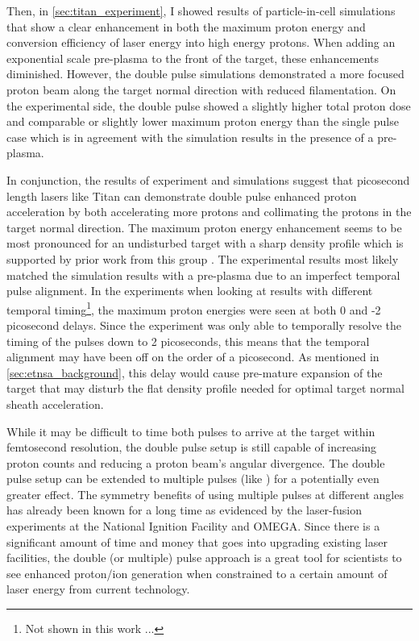 Then, in \autoref{sec:titan_experiment}, I showed results of particle-in-cell simulations that show a clear enhancement in both the maximum proton energy and conversion efficiency of laser energy into high energy protons. When adding an exponential scale pre-plasma to the front of the target, these enhancements diminished. However, the double pulse simulations demonstrated a more focused proton beam along the target normal direction with reduced filamentation. On the experimental side, the double pulse showed a slightly higher total proton dose and comparable or slightly lower maximum proton energy than the single pulse case which is in agreement with the simulation results in the presence of a pre-plasma.

In conjunction, the results of experiment and simulations suggest that picosecond length lasers like Titan can demonstrate double pulse enhanced proton acceleration by both accelerating more protons and collimating the protons in the target normal direction. The maximum proton energy enhancement seems to be most pronounced for an undisturbed target with a sharp density profile which is supported by prior work from this group \cite{Rahman_2021_PoP}. The experimental results most likely matched the simulation results with a pre-plasma due to an imperfect temporal pulse alignment. In the experiments when looking at results with different temporal timing\footnote{Not shown in this work ...}, the maximum proton energies were seen at both 0 and -2 picosecond delays. Since the experiment was only able to temporally resolve the timing of the pulses down to 2 picoseconds, this means that the temporal alignment may have been off on the order of a picosecond. As mentioned in \autoref{sec:etnsa_background}, this delay would cause pre-mature expansion of the target that may disturb the flat density profile needed for optimal target normal sheath acceleration. 

While it may be difficult to time both pulses to arrive at the target within femtosecond resolution, the double pulse setup is still capable of increasing proton counts and reducing a proton beam's angular divergence. The double pulse setup can be extended to multiple pulses (like \cite{Morace_2019_Nat_Comm}) for a potentially even greater effect. The symmetry benefits of using multiple pulses at different angles has already been known for a long time as evidenced by the laser-fusion experiments at the National Ignition Facility and OMEGA. Since there is a significant amount of time and money that goes into upgrading existing laser facilities, the double (or multiple) pulse approach is a great tool for scientists to see enhanced proton/ion generation when constrained to a certain amount of laser energy from current technology.